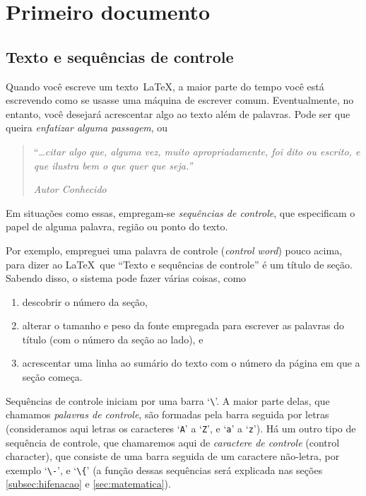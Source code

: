 \section{Primeiro documento}


\subsection{Texto e sequências de controle}\label{subsec:seq-controle}

Quando você escreve um texto~\LaTeX, a maior parte do tempo você está
escrevendo como se usasse uma máquina de escrever
comum. Eventualmente, no entanto, você desejará acrescentar algo ao
texto além de palavras. Pode ser que queira \emph{enfatizar alguma
  passagem}, ou

\begin{quote}
  ``\ldots \textsl{citar algo que, alguma vez, muito apropriadamente, foi
    dito ou escrito, e que ilustra bem o que quer que seja.''}

  \hfill\textsl{Autor Conhecido}
\end{quote}

Em situações como essas, empregam-se \emph{sequências de controle},
que especificam o papel de alguma palavra, região ou ponto do texto.

Por exemplo, empreguei uma palavra de controle (\emph{control word\/})
pouco acima, para dizer ao \LaTeX\ que ``Texto e sequências de
controle'' é um título de seção. Sabendo disso,  o sistema pode fazer
várias coisas, como
\begin{enumerate}
\item descobrir o número da seção,
\item alterar o tamanho e peso da fonte empregada para escrever as
  palavras do título (com o número da seção ao lado), e
\item acrescentar uma linha ao sumário do texto com o número da página
  em que a seção começa.
\end{enumerate}

Sequências de controle iniciam por uma barra `\verb|\|'. A maior parte
delas, que chamamos \emph{palavras de controle}, são formadas pela
barra seguida por letras (consideramos aqui letras os
caracteres `\texttt{A}' a `\texttt{Z}', e `\texttt{a}' a
`\texttt{z}'). Há um outro tipo
de sequência de controle, que chamaremos aqui de \emph{caractere de controle}
(control character), que consiste de uma barra seguida de um caractere
não-letra, por exemplo `\verb|\-|', e `\verb|\{|' (a função dessas
sequências será explicada nas seções \ref{subsec:hifenacao} e
\ref{sec:matematica}).


